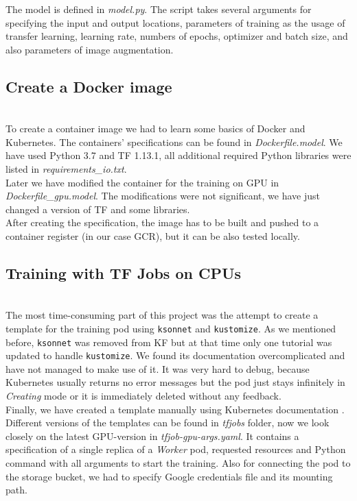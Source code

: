 \documentclass[
	12pt, %
]{fphw}
\begin{document}
The model is defined in \textit{model.py}. The script takes several arguments for specifying the input and output locations, parameters of training as the usage of transfer learning, learning rate, numbers of epochs, optimizer and batch size, and also parameters of image augmentation.\\

\subsection*{Create a Docker image}
\ \\ 

To create a container image we had to learn some basics of Docker and Kubernetes. The containers' specifications can be found in \textit{Dockerfile.model}. We have used Python 3.7 and TF 1.13.1, all additional required Python libraries were listed in \textit{requirements\_io.txt}.\\

Later we have modified the container for the training on GPU in \textit{Dockerfile\_gpu.model}. The modifications were not significant, we have just changed a version of TF and some libraries.\\

After creating the specification, the image has to be built and pushed to a container register (in our case GCR), but it can be also tested locally.


\subsection*{Training with TF Jobs on CPUs}
\ \\

The most time-consuming part of this project was the attempt to create a template for the training pod using \verb|ksonnet| and \verb|kustomize|. As we mentioned before, \verb|ksonnet| was removed from KF but at that time only one tutorial was updated to handle \verb|kustomize|. We found its documentation overcomplicated and have not managed to make use of it. It was very hard to debug, because Kubernetes usually returns no error messages but the pod just stays infinitely in \textit{Creating} mode or it is immediately deleted without any feedback.\\

Finally, we have created a template manually using Kubernetes documentation \cite{k8s}. Different versions of the templates can be found in \textit{tfjobs} folder, now we look closely on the latest GPU-version in  \textit{tfjob-gpu-args.yaml}. It contains a specification of a single replica of a \textit{Worker} pod, requested resources and Python command with all arguments to start the training. Also for connecting the pod to the storage bucket, we had to specify Google credentials file and its mounting path.
\end{document}
